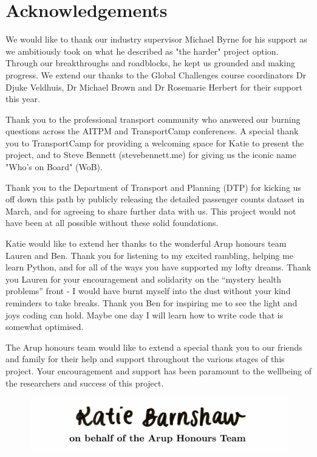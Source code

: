 \chapter{Acknowledgements}
We would like to thank our industry supervisor Michael Byrne for his support as we ambitiously took on what he described as "the harder" project option. Through our breakthroughs and roadblocks, he kept us grounded and making progress. We extend our thanks to the Global Challenges course coordinators Dr Djuke Veldhuis, Dr Michael Brown and Dr Rosemarie Herbert for their support this year.

Thank you to the professional transport community who answered our burning questions across the AITPM and TransportCamp conferences. A special thank you to TransportCamp for providing a welcoming space for Katie to present the project, and to Steve Bennett (stevebennett.me) for giving us the iconic name "Who's on Board" (WoB). 

Thank you to the Department of Transport and Planning (DTP) for kicking us off down this path by publicly releasing the detailed passenger counts dataset in March, and for agreeing to share further data with us. This project would not have been at all possible without these solid foundations.

Katie would like to extend her thanks to the wonderful Arup honours team Lauren and Ben. Thank you for listening to my excited rambling, helping me learn Python, and for all of the ways you have supported my lofty dreams. Thank you Lauren for your encouragement and solidarity on the “mystery health problems” front - I would have burnt myself into the dust without your kind reminders to take breaks. Thank you Ben for inspiring me to see the light and joys coding can hold. Maybe one day I will learn how to write code that is somewhat optimised. 

The Arup honours team would like to extend a special thank you to our friends and family for their help and support throughout the various stages of this project. Your encouragement and support has been paramount to the wellbeing of the researchers and success of this project.

\begin{figure}[ht]
    \centering
    \includegraphics[width=0.6\linewidth]{images/Case_Study/katiesignyippeee.PNG}
\end{figure}
